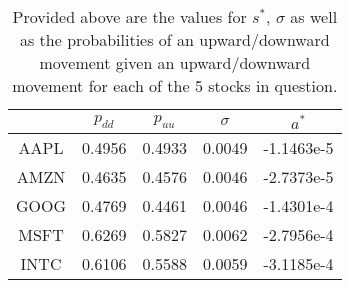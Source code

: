 \begin{table}[htpb]

\centering
\small

\begin{tabular}{ c | c | c | c | c }

 & $p_{dd}$ & $p_{uu}$ & $\sigma$ & $a^*$\\
\hline
AAPL & 0.4956 & 0.4933 & 0.0049 & -1.1463e-5\\

AMZN & 0.4635 & 0.4576 & 0.0046 & -2.7373e-5\\

GOOG & 0.4769 & 0.4461 & 0.0046 & -1.4301e-4\\

MSFT & 0.6269 & 0.5827 & 0.0062 & -2.7956e-4\\

INTC & 0.6106 & 0.5588 & 0.0059 & -3.1185e-4\\

\end{tabular}

\caption{ \label{table:chpdo_coeff} Provided above are the values for $s^*$, $\sigma$ as well as the probabilities of an upward/downward movement given an upward/downward movement for each of the 5 stocks in question.}
\end{table}